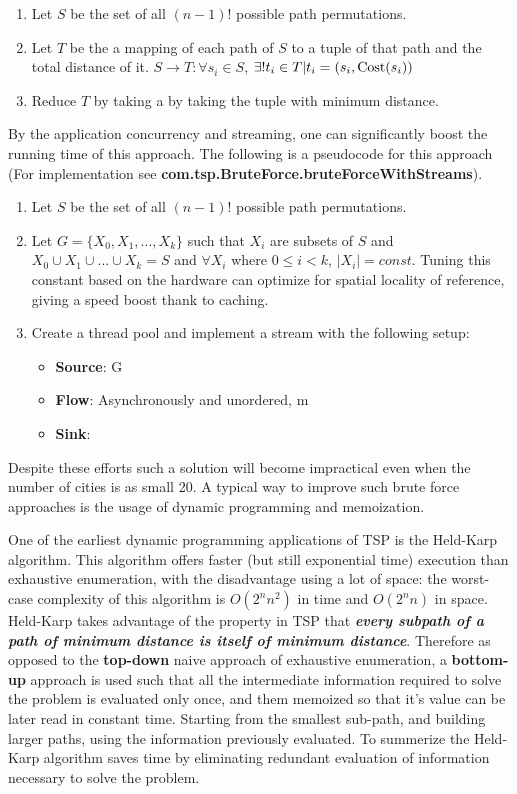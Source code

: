 \documentclass[11pt]{article}
\begin{document}
\begin{enumerate}
\item Let $S$ be the set of all $(n-1)!$ possible path permutations.
\item Let $T$ be the a mapping of each path of $S$ to a tuple of that path and the total distance of it. $ S\rightarrow T: \forall s_i \in S $, $ \exists! t_i \in T|t_i =(s_i, \textup{Cost}(s_i))$
\item Reduce $T$ by taking a by taking the tuple with minimum distance.
\end{enumerate}


By the application concurrency and streaming, one can significantly boost the running time of this approach. The following is a pseudocode for this approach (For implementation see \textbf{com.tsp.BruteForce.bruteForceWithStreams}). 

\begin{enumerate}
\item Let $S$ be the set of all $(n-1)!$ possible path permutations.
\item Let $G = \{X_0, X_1, ..., X_k\} $ such that $X_i$ are subsets of $S$ and $X_0 \cup X_1 \cup ... \cup X_k = S$ and $\forall X_i$ where $ 0 \leq i< k$, $\left | X_i \right | = const.$ Tuning this constant based on the hardware can optimize for spatial locality of reference, giving a speed boost thank to caching.
\item Create a thread pool and implement a stream with the following setup:
\begin{itemize}
\item \textbf{Source}: G
\item \textbf{Flow}: Asynchronously and unordered, m
\item \textbf{Sink}: 
\end{itemize}
\end{enumerate}

 Despite these efforts such a solution will become impractical even when the number of cities is as small 20. A typical way to improve such brute force approaches is the usage of dynamic programming and memoization. \par
 One of the earliest dynamic programming applications of TSP is the Held-Karp algorithm. This algorithm offers faster (but still exponential time) execution than exhaustive enumeration, with the disadvantage using a lot of space: the worst-case complexity of this algorithm is $O(2^n n^2)$ in time and $O(2^n n)$ in space. Held-Karp takes advantage of the property in TSP that \textbf{\textit{every subpath of a path of minimum distance is itself of minimum distance}}. Therefore as opposed to the \textbf{top-down} naive approach of exhaustive enumeration, a \textbf{bottom-up} approach is used such that all the intermediate information required to solve the problem is evaluated only once, and them memoized so that it's value can be later read in constant time. Starting from the smallest sub-path, and building larger paths, using the information previously evaluated. To summerize the Held-Karp algorithm saves time by eliminating redundant evaluation of information necessary to solve the problem. 
\end{document}
